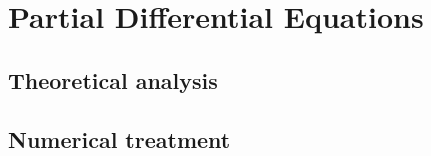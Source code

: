 \section{Partial Differential Equations}\label{sec:PDE}
\subsection{Theoretical analysis} \label{sec:theoPDE}
\subsection{Numerical treatment} \label{sec:numPDE}